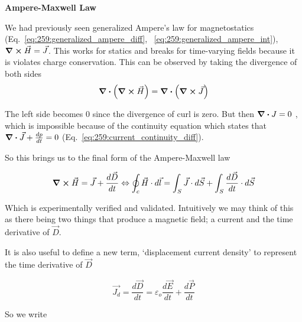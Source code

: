 \documentclass[10pt]{article}
\begin{document}
\begin{definition}
	\textbf{Ampere-Maxwell Law}

	We had previously seen generalized Ampere's law for magnetostatics (Eq.~\ref{eq:259:generalized_ampere_diff}, ~\ref{eq:259:generalized_ampere_int}), $ \curl \vec{H} = \vec{J} $.
	This works for statics and breaks for time-varying fields because it is violates charge conservation.
	This can be observed by taking the divergence of both sides
	\begin{equation}
		\divergence (\curl \vec{H}) = \divergence (\curl \vec{J}) 
	\end{equation}

	The left side becomes $ 0 $ since the divergence of curl is zero.
	But then $ \divergence J = 0$ , which is impossible because of the continuity equation which states that $ \divergence \vec{J} + \frac{dp}{dt} = 0 $ (Eq.~\ref{eq:259:current_continuity_diff}).

	So this brings us to the final form of the Ampere-Maxwell law

	\begin{equation}
		\curl \vec{H} = \vec{J} + \frac{d\vec{D}}{dt} \Leftrightarrow \oint_c \vec{H} \cdot  d \vec{l} = \int_S \vec{J} \cdot  d \vec{S} + \int_S \frac{d \vec{D}}{dt} \cdot  d \vec{S}
	\end{equation}

	Which is experimentally verified and validated.
	Intuitively we may think of this as there being two things that produce a magnetic field; a current and the time derivative of $ \vec{D} $.



\end{definition}

It is also useful to define a new term, `displacement current density' to represent the time derivative of $ \vec{D} $ 


\begin{equation}
	\vec{J_d} = \frac{d \vec{D}}{dt} = \varepsilon_o \frac{d \vec{E}}{dt} + \frac{d \vec{P}}{dt} 
\end{equation}



So we write 
\end{document}
